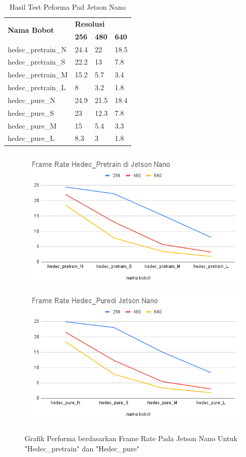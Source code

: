 \begin{longtable}{|l|l|l|l|} 
  \caption{Hasil Test Peforma Pad Jetson Nano}
  \label{tb:jetsonanoperformancetest}\\
  \hline
  \multirow{2}{*}{\textbf{Nama Bobot}} & \multicolumn{3}{l|}{\textbf{Resolusi}}      \\ 
  \cline{2-4}
                                       & \textbf{256} & \textbf{480} & \textbf{640}  \\ 
  \hline
  hedec\_pretrain\_N                   & 24.4         & 22           & 18.5          \\
  hedec\_pretrain\_S                   & 22.2         & 13           & 7.8           \\
  hedec\_pretrain\_M                   & 15.2         & 5.7          & 3.4           \\
  hedec\_pretrain\_L                   & 8            & 3.2          & 1.8           \\
  hedec\_pure\_N                       & 24.9         & 21.5         & 18.4          \\
  hedec\_pure\_S                       & 23           & 12.3         & 7.8           \\
  hedec\_pure\_M                       & 15           & 5.4          & 3.3           \\
  hedec\_pure\_L                       & 8.3          & 3            & 1.8           \\
  \hline
\end{longtable}

\begin{figure} [h!]
  \centering
  \includegraphics[width=.45\textwidth]{gambar/performance_jetson/Frame Rate Hedec_Pretrain di Jetson Nano.png}
  \includegraphics[width=.45\textwidth]{gambar/performance_jetson/Frame Rate Hedec_Puredi Jetson Nano.png}
  \caption{Grafik Performa berdasarkan Frame Rate Pada Jetson Nano Untuk "Hedec\_pretrain" dan "Hedec\_pure"}
  \label{fig:graf_jetsonano}  
\end{figure}

